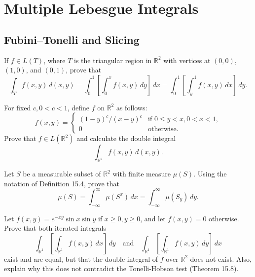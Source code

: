 \chapter{Multiple Lebesgue Integrals}


\section{Fubini--Tonelli and Slicing}
 
\begin{problembox}
If \( f \in L(T) \), where \( T \) is the triangular region in \( \mathbb{R}^2 \) with vertices at \((0, 0)\), \((1, 0)\), and \((0, 1)\), prove that
\[
\int_T f(x, y) \, d(x, y) = \int_0^1 \left[ \int_0^x f(x, y) \, dy \right] \, dx = \int_0^1 \left[ \int_y^1 f(x, y) \, dx \right] \, dy.
\]
\end{problembox}

\begin{problembox}
For fixed \( c, 0 < c < 1 \), define \( f \) on \( \mathbb{R}^2 \) as follows:
\[
f(x, y) = 
\begin{cases} 
(1 - y)^c / (x - y)^c & \text{if } 0 \leq y < x, 0 < x < 1, \\
0 & \text{otherwise}.
\end{cases}
\]
Prove that \( f \in L(\mathbb{R}^2) \) and calculate the double integral 
\[
\int_{\mathbb{R}^2} f(x, y) \, d(x, y).
\]
\end{problembox}

\begin{problembox}
Let \( S \) be a measurable subset of \( \mathbb{R}^2 \) with finite measure \( \mu(S) \). Using the notation of Definition 15.4, prove that
\[
\mu(S) = \int_{-\infty}^{\infty} \mu(S^x) \, dx = \int_{-\infty}^{\infty} \mu(S_y) \, dy.
\]
\end{problembox}

\begin{problembox}
Let \( f(x, y) = e^{-xy} \sin x \sin y \) if \( x \geq 0, y \geq 0 \), and let \( f(x, y) = 0 \) otherwise. Prove that both iterated integrals
\[
\int_{\mathbb{R}^1} \left[ \int_{\mathbb{R}^1} f(x, y) \, dx \right] \, dy \quad \text{and} \quad \int_{\mathbb{R}^1} \left[ \int_{\mathbb{R}^1} f(x, y) \, dy \right] \, dx
\]
exist and are equal, but that the double integral of \( f \) over \( \mathbb{R}^2 \) does not exist. Also, explain why this does not contradict the Tonelli-Hobson test (Theorem 15.8).
\end{problembox}

